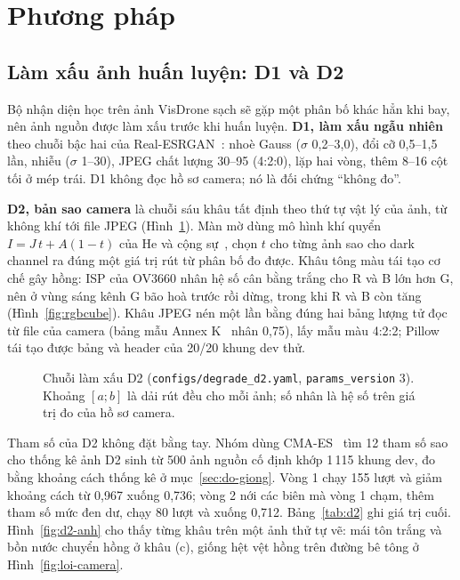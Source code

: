 \section{Phương pháp}\label{sec:phuong-phap}

\subsection{Làm xấu ảnh huấn luyện: D1 và D2}

Bộ nhận diện học trên ảnh VisDrone sạch sẽ gặp một phân bố khác hẳn khi bay, nên ảnh nguồn được làm xấu trước khi huấn luyện. \textbf{D1, làm xấu ngẫu nhiên} theo chuỗi bậc hai của Real-ESRGAN~\cite{realesrgan}: nhoè Gauss ($\sigma$ 0,2–3,0), đổi cỡ 0,5–1,5 lần, nhiễu ($\sigma$ 1–30), JPEG chất lượng 30–95 (4:2:0), lặp hai vòng, thêm 8–16 cột tối ở mép trái. D1 không đọc hồ sơ camera; nó là đối chứng ``không đo''.

\textbf{D2, bản sao camera} là chuỗi sáu khâu tất định theo thứ tự vật lý của ảnh, từ không khí tới file JPEG (Hình~\ref{fig:d2-chuoi}). Màn mờ dùng mô hình khí quyển $I = J\,t + A(1-t)$ của He và cộng sự~\cite{he-dcp}, chọn $t$ cho từng ảnh sao cho dark channel ra đúng một giá trị rút từ phân bố đo được. Khâu tông màu tái tạo cơ chế gây hồng: ISP của OV3660 nhân hệ số cân bằng trắng cho R và B lớn hơn G, nên ở vùng sáng kênh G bão hoà trước rồi dừng, trong khi R và B còn tăng (Hình~\ref{fig:rgbcube}). Khâu JPEG nén một lần bằng đúng hai bảng lượng tử đọc từ file của camera (bảng mẫu Annex K~\cite{jpeg} nhân 0,75), lấy mẫu màu 4:2:2; Pillow tái tạo được bảng và header của 20/20 khung dev thử.

\begin{figure}[!htbp]
\centering

\caption[Chuỗi làm xấu D2 (\texttt{configs/degrade\_d2.yaml}, \texttt{params\_version} 3)]{Chuỗi làm xấu D2 (\texttt{configs/degrade\_d2.yaml}, \texttt{params\_version} 3). Khoảng $[a;b]$ là dải rút đều cho mỗi ảnh; số nhân là hệ số trên giá trị đo của hồ sơ camera.}
\label{fig:d2-chuoi}
\end{figure}

Tham số của D2 không đặt bằng tay. Nhóm dùng CMA-ES~\cite{cmaes} tìm 12 tham số sao cho thống kê ảnh D2 sinh từ 500 ảnh nguồn cố định khớp 1\,115 khung dev, đo bằng khoảng cách thống kê ở mục~\ref{sec:do-giong}. Vòng 1 chạy 155 lượt và giảm khoảng cách từ 0,967 xuống 0,736; vòng 2 nới các biên mà vòng 1 chạm, thêm tham số mức đen dư, chạy 80 lượt và xuống 0,712. Bảng~\ref{tab:d2} ghi giá trị cuối. Hình~\ref{fig:d2-anh} cho thấy từng khâu trên một ảnh thử tự vẽ: mái tôn trắng và bồn nước chuyển hồng ở khâu (c), giống hệt vệt hồng trên đường bê tông ở Hình~\ref{fig:loi-camera}.

